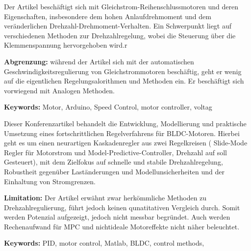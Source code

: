 %	
%
%	   




{ 
	Der Artikel  \cite{Ali:2023} beschäftigt sich mit Gleichstrom-Reihenschlussmotoren und deren Eigenschaften, insbesondere dem hohen Anlaufdrehmoment und dem veränderlichen Drehzahl-Drehmoment-Verhalten. Ein Schwerpunkt liegt auf verschiedenen Methoden zur Drehzahlregelung, wobei die Steuerung über die Klemmenspannung hervorgehoben wird.r 
	
	\bigskip
	
	\textbf{Abgrenzung:} während der Artikel sich mit der automatischen Geschwindigkeitsregulierung von Gleichstrommotoren beschäftig, geht er wenig auf die eigentlichen Regelungsalorithmen und Methoden ein. Er beschäftigt sich vorwiegend mit Analogen Methoden. 
	
	\scriptsize{\textbf{Keywords:} Motor, Arduino, Speed Control, motor controller, voltag}
}




{ 
	
	Dieser Konferenzartikel \cite{Aghaee:2018}  behandelt die Entwicklung, Modellierung und praktische Umsetzung eines fortschrittlichen Regelverfahrens für BLDC-Motoren. Hierbei geht es um einen neurartigen Kaskadenregler aus zwei Regelkreisen ( Slide-Mode Regler für Motorstrom und Model-Predictive-Controller, Drehzahl auf soll Gesteuert), mit dem Zielfokus auf schnelle und stabile Drehzahlregelung, Robustheit gegenüber Laständerungen und Modellunsicherheiten
	und der Einhaltung von Stromgrenzen. 
	
	\bigskip
	
	\textbf{Limitation:} Der Artikel erwähnt zwar herkömmliche Methoden zu Drehzahlregulierung, führt jedoch keinen qunatitativen Vergleich durch. Somit werden Potenzial aufgezeigt, jedoch nicht messbar begründet. Auch werden Rechenaufwand für MPC und nichtideale Motoreffekte nicht näher beleuchtet. 
	
	\scriptsize{\textbf{Keywords:} PID, motor control, Matlab, BLDC, control methods,   }
}


